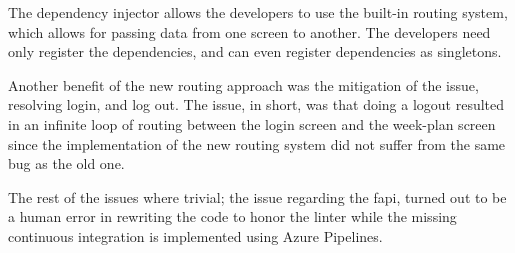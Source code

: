 The dependency injector allows the developers to use the built-in routing system, which allows for passing data from one screen to another. The developers need only register the dependencies, and can even register dependencies as singletons.

Another benefit of the new routing approach was the mitigation of the issue, resolving login, and log out. The issue, in short, was that doing a logout resulted in an infinite loop of routing between the login screen and the week-plan screen since the implementation of the new routing system did not suffer from the same bug as the old one.

The rest of the issues where trivial; the issue regarding the \gls{fapi}, turned out to be a human error in rewriting the code to honor the linter while the missing continuous integration is implemented using Azure Pipelines.